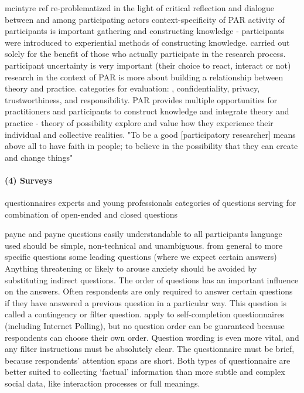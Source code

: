 \documentclass[11pt]{report}
\begin{document}
mcintyre ref
re-problematized in the light of critical reflection and dialogue between and among participating actors
context-specificity of PAR
activity of participants is important
gathering and constructing knowledge -  participants 
were  introduced  to  experiential  methods  of  constructing  knowledge.
carried out solely for the benefit of those who actually participate in the research process. 
participant uncertainty is very important (their choice to react, interact or not)
research in the context of PAR is more about building a relationship between theory and practice.
categories for evaluation: , confidentiality,  privacy,  trustworthiness,  and  responsibility.
PAR provides  multiple opportunities for practitioners and participants to construct knowledge and integrate theory and practice - theory of possibility
explore and value how they experience  their  individual  and  collective  realities.
"To  be  a  good  [participatory  researcher] means  above all to  have faith  in people;  to believe in  the possibility that they can create and change things" 

\paragraph{(4) Surveys}

questionnaires
experts and young professionals
categories of questions
serving for
combination of open-ended and closed questions

payne and payne
questions easily understandable to all participants
language used should be simple, non-technical and unambiguous.
from general to more specific questions
some leading questions (where we expect certain answers)
Anything threatening or likely to arouse anxiety should be avoided by substituting indirect questions.
The order of questions has an important influence on the answers.
Often respondents are only required to answer certain questions if they
have answered a previous question in a particular way. This question is
called a contingency or filter question.  apply  to  self-completion questionnaires (including  Internet  Polling), but  no  question  order  can  be  guaranteed because respondents can choose their own order. 
Question wording is even more  vital, and  any  filter  instructions  must  be  absolutely  clear. The questionnaire must be brief, because respondents’ attention spans are short. 
Both  types  of  questionnaire  are  better  suited  to  collecting  ‘factual’
information than more subtle and complex social data, like interaction
processes or full meanings.
\end{document}
